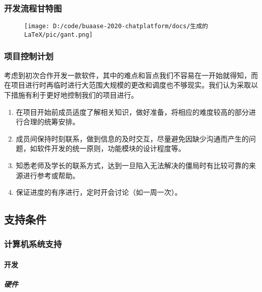 \documentclass[
]{article}
\begin{document}
\hypertarget{header-n561}{%
\subsubsection{开发流程甘特图}\label{header-n561}}

\begin{figure}
\centering
\texttt{[image: D:/code/buaase-2020-chatplatform/docs/生成的LaTeX/pic/gant.png]}
\caption{}
\end{figure}

\hypertarget{header-n563}{%
\subsubsection{项目控制计划}\label{header-n563}}

考虑到初次合作开发一款软件，其中的难点和盲点我们不容易在一开始就得知，而在项目进行时再临时进行大范围大规模的更改和调度也不够现实。我们认为采取以下措施有利于更好地控制我们的项目进行。

\begin{enumerate}
\def\labelenumi{\arabic{enumi}.}
\item
  在项目开始前成员适度了解相关知识，做好准备，将相应的难度较高的部分进行合理的统筹安排。
\item
  成员间保持时刻联系，做到信息的及时交互，尽量避免因缺少沟通而产生的问题，如软件开发的统一原则，功能模块的设计程度等。
\item
  知悉老师及学长的联系方式，达到一旦陷入无法解决的僵局时有比较可靠的来源进行参考或帮助。
\item
  保证进度的有序进行，定时开会讨论（如一周一次）。
\end{enumerate}

\hypertarget{header-n574}{%
\subsection{支持条件}\label{header-n574}}

\hypertarget{header-n575}{%
\subsubsection{计算机系统支持}\label{header-n575}}

\hypertarget{header-n576}{%
\paragraph{开发}\label{header-n576}}

\hypertarget{header-n577}{%
\subparagraph{硬件}\label{header-n577}}
\end{document}
